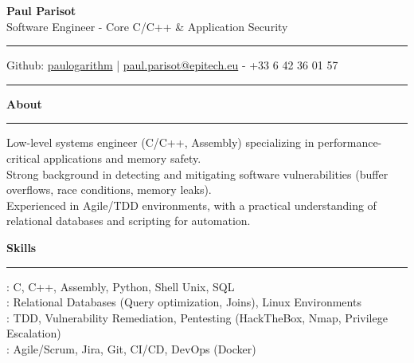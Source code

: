 \documentclass[9pt]{extarticle}
\begin{document}
\begin{center}
    {\huge\bfseries Paul Parisot}
    \\[10pt]
    {\Large Software Engineer - Core C/C++ \& Application Security}
    \\
\end{center}

\par\vspace{-10pt}
\rule{\linewidth}{0.4pt}
\par\vspace{-10pt}

\begin{center}
    Github: \href{https://github.com/paulogarithm}{paulogarithm} 
    \quad | \quad 
    \href{mailto:paul.parisot@epitech.eu}{paul.parisot@epitech.eu} - +33 6 42 36 01 57
\end{center}

\par\vspace{-15pt}
\rule{\linewidth}{0.4pt}
\par\vspace{5pt}

{\large\bfseries About}
\par\vspace{-8pt}
\rule{\linewidth}{0.4pt}
\par\vspace{5pt}

Low-level systems engineer (C/C++, Assembly) specializing in performance-critical applications and memory safety. \\
Strong background in detecting and mitigating software vulnerabilities (buffer overflows, race conditions, memory leaks). \\
Experienced in Agile/TDD environments, with a practical understanding of relational databases and scripting for automation.

\par\vspace{5pt}

{\large\bfseries Skills}
\par\vspace{-8pt}
\rule{\linewidth}{0.4pt}
\par\vspace{5pt}

\hspace*{5pt}{\bfseries Core Languages}: C, C++, Assembly, Python, Shell Unix, SQL \\
\hspace*{5pt}{\bfseries Data \& Systems}: Relational Databases (Query optimization, Joins), Linux Environments \\
\hspace*{5pt}{\bfseries Security \& Testing}: TDD, Vulnerability Remediation, Pentesting (HackTheBox, Nmap, Privilege Escalation) \\
\hspace*{5pt}{\bfseries Workflow}: Agile/Scrum, Jira, Git, CI/CD, DevOps (Docker)
\end{document}
